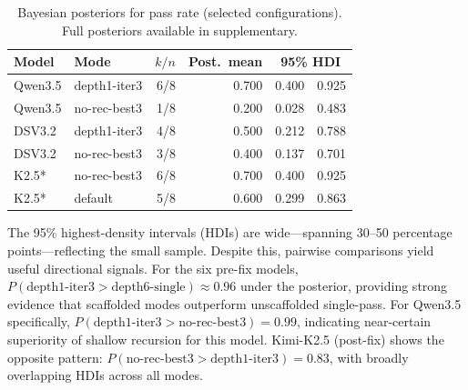 \documentclass[11pt]{article}
\begin{document}
\begin{table}[t]
\centering
\caption{Bayesian posteriors for pass rate (selected configurations). Full posteriors available in supplementary.}
\label{tab:bayesian-selected}
\begin{tabular}{llrrrr}
\toprule
Model & Mode & $k/n$ & Post.\ mean & \multicolumn{2}{c}{95\% HDI} \\
\midrule
Qwen3.5 & depth1-iter3 & 6/8 & 0.700 & 0.400 & 0.925 \\
Qwen3.5 & no-rec-best3 & 1/8 & 0.200 & 0.028 & 0.483 \\
DSV3.2 & depth1-iter3 & 4/8 & 0.500 & 0.212 & 0.788 \\
DSV3.2 & no-rec-best3 & 3/8 & 0.400 & 0.137 & 0.701 \\
K2.5* & no-rec-best3 & 6/8 & 0.700 & 0.400 & 0.925 \\
K2.5* & default & 5/8 & 0.600 & 0.299 & 0.863 \\
\bottomrule
\end{tabular}
\end{table}

The 95\% highest-density intervals (HDIs) are wide---spanning 30--50 percentage points---reflecting the small sample. Despite this, pairwise comparisons yield useful directional signals. For the six pre-fix models, $P(\text{depth1-iter3} > \text{depth6-single}) \approx 0.96$ under the posterior, providing strong evidence that scaffolded modes outperform unscaffolded single-pass. For Qwen3.5 specifically, $P(\text{depth1-iter3} > \text{no-rec-best3}) = 0.99$, indicating near-certain superiority of shallow recursion for this model. Kimi-K2.5 (post-fix) shows the opposite pattern: $P(\text{no-rec-best3} > \text{depth1-iter3}) = 0.83$, with broadly overlapping HDIs across all modes.
\end{document}

